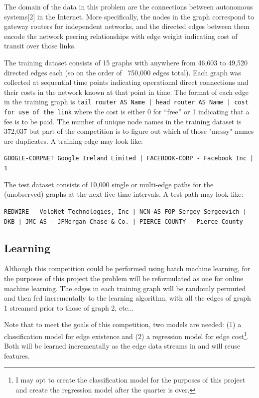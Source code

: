 \documentclass{article} %
\begin{document}
The domain of the data in this problem are the connections between
autonomous systems[2] in the Internet.  More specifically, the nodes in the
graph correspond to gateway routers for independent networks, and the directed
edges between them encode the network peering relationships with edge weight indicating cost of
transit over those links.

The training dataset consists of 15 graphs with anywhere from 46,603 to 49,520 directed edges each (so on the
order of ~750,000 edges total).  Each graph was collected at sequential time
points indicating operational direct connections and their costs in the
network known at that point in time.  The format of each edge in the
training graph is \texttt{tail router AS Name | head router AS
  Name | cost for use of the link} where the cost is either 0 for ``free'' or 1
indicating that a fee is to be paid.  The number of unique node names in the
training dataset is 372,037 but part of the competition is to figure out
which of those "messy" names are duplicates.  A training edge may look like:

\texttt{{\small GOOGLE-CORPNET Google Ireland Limited | FACEBOOK-CORP - Facebook Inc | 1}}

The test dataset consists of 10,000 single or multi-edge paths for the (unobserved)
graphs at the next five time intervals.  A test path may look like:

\texttt{{\small REDWIRE - VoloNet Technologies, Inc | NCN-AS FOP Sergey Sergeevich | DKB | JMC-AS - JPMorgan Chase \& Co. | PIERCE-COUNTY - Pierce County}}

\subsection{Learning}

Although this competition could be performed using batch machine learning,
for the purposes of this project the problem will be reformulated as one for
online machine learning.  The edges in each training graph will be randomly
permuted and then fed incrementally to the learning algorithm, with all the
edges of graph 1 streamed prior to those of graph 2, etc...

Note that to meet the goals of this competition, two models are needed: (1)
a classification model for edge existence and (2) a regression model for
edge cost\footnote{I may opt to create the classification model for the
  purposes of this project and create the regression model after the quarter
is over.}.  Both will be learned incrementally as the edge data streams in
and will reuse features.
\end{document}

